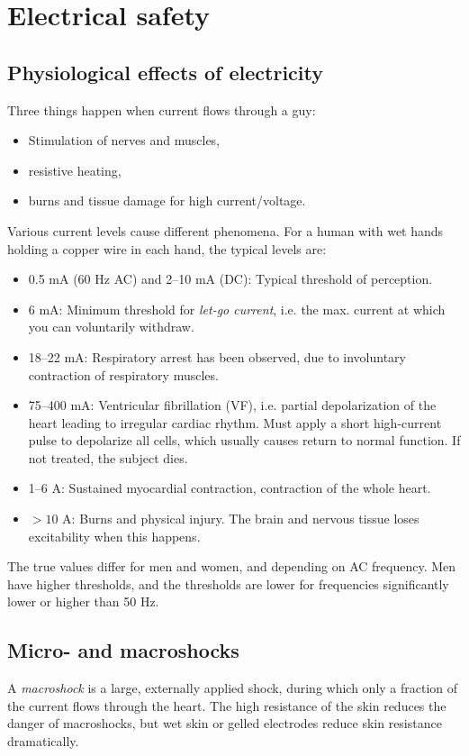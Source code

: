 \section{Electrical safety}

\subsection{Physiological effects of electricity}
Three things happen when current flows through a guy:
\begin{itemize}
    \item Stimulation of nerves and muscles,
    \item resistive heating,
    \item burns and tissue damage for high current/voltage.
\end{itemize}

Various current levels cause different phenomena. For a human with wet hands holding a copper wire in each hand, the typical levels are:
\begin{itemize}
    \item 0.5 mA (60 Hz AC) and 2--10 mA (DC): Typical threshold of perception.
    \item 6 mA: Minimum threshold for \emph{let-go current}, i.e. the max. current at which you can voluntarily withdraw.
    \item 18--22 mA: Respiratory arrest has been observed, due to involuntary contraction of respiratory muscles.
    \item 75--400 mA: Ventricular fibrillation (VF), i.e. partial depolarization of the heart leading to irregular cardiac rhythm. Must apply a short high-current pulse to depolarize all cells, which usually causes return to normal function. If not treated, the subject dies.
    \item 1--6 A: Sustained myocardial contraction, contraction of the whole heart.
    \item $>10$ A: Burns and physical injury. The brain and nervous tissue loses excitability when this happens.
\end{itemize}

The true values differ for men and women, and depending on AC frequency. Men have higher thresholds, and the thresholds are lower for frequencies significantly lower or higher than 50 Hz.

\subsection{Micro- and macroshocks}
A \emph{macroshock} is a large, externally applied shock, during which only a fraction of the current flows through the heart. The high resistance of the skin reduces the danger of macroshocks, but wet skin or gelled electrodes reduce skin resistance dramatically.

